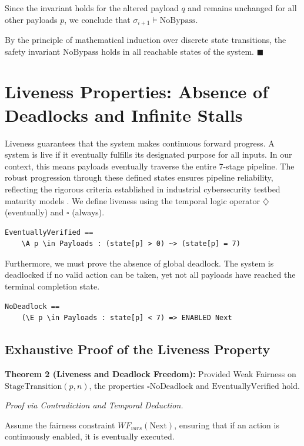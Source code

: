 Since the invariant holds for the altered payload $q$ and remains unchanged for all other payloads $p$, we conclude that $\sigma_{i+1} \models \text{NoBypass}$.

By the principle of mathematical induction over discrete state transitions, the safety invariant $\text{NoBypass}$ holds in all reachable states of the system. $\blacksquare$

\section{Liveness Properties: Absence of Deadlocks and Infinite Stalls}
Liveness guarantees that the system makes continuous forward progress. A system is live if it eventually fulfills its designated purpose for all inputs. In our context, this means payloads eventually traverse the entire 7-stage pipeline. The robust progression through these defined states ensures pipeline reliability, reflecting the rigorous criteria established in industrial cybersecurity testbed maturity models \cite{ref_ICSCTM2Industri30}. We define liveness using the temporal logic operator $\diamondsuit$ (eventually) and $\square$ (always).

\begin{verbatim}
EventuallyVerified == 
    \A p \in Payloads : (state[p] > 0) ~> (state[p] = 7)
\end{verbatim}

Furthermore, we must prove the absence of global deadlock. The system is deadlocked if no valid action can be taken, yet not all payloads have reached the terminal completion state.

\begin{verbatim}
NoDeadlock == 
    (\E p \in Payloads : state[p] < 7) => ENABLED Next
\end{verbatim}

\subsection{Exhaustive Proof of the Liveness Property}
\textbf{Theorem 2 (Liveness and Deadlock Freedom):} Provided Weak Fairness on $\text{StageTransition}(p, n)$, the properties $\square \text{NoDeadlock}$ and $\text{EventuallyVerified}$ hold.

\textit{Proof via Contradiction and Temporal Deduction.}

Assume the fairness constraint $WF_{vars}(\text{Next})$, ensuring that if an action is continuously enabled, it is eventually executed.

